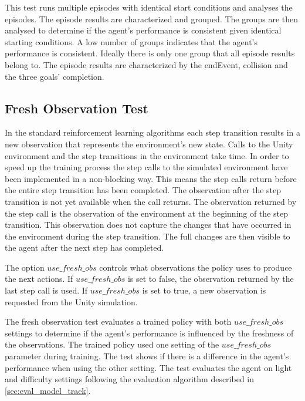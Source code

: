This test runs multiple episodes with identical start conditions and analyses the episodes. The episode results are characterized and grouped. The groups are then analysed to determine if the agent's performance is consistent given identical starting conditions. A low number of groups indicates that the agent's performance is consistent. Ideally there is only one group that all episode results belong to.
The episode results are characterized by the endEvent, collision and the three goals' completion.



\subsection{Fresh Observation Test}

In the standard reinforcement learning algorithms each step transition results in a new observation that represents the environment's new state. Calls to the Unity environment and the step transitions in the environment take time. In order to speed up the training process the step calls to the simulated environment have been implemented in a non-blocking way. This means the step calls return before the entire step transition has been completed. The observation after the step transition is not yet available when the call returns. The observation returned by the step call is the observation of the environment at the beginning of the step transition. This observation does not capture the changes that have occurred in the environment during the step transition. The full changes are then visible to the agent after the next step has completed. 

The option $use\_fresh\_obs$ controls what observations the policy uses to produce the next actions. If $use\_fresh\_obs$ is set to false, the observation returned by the last step call is used. If $use\_fresh\_obs$ is set to true, a new observation is requested from the Unity simulation.

The fresh observation test evaluates a trained policy with both $use\_fresh\_obs$ settings to determine if the agent's performance is influenced by the freshness of the observations. The trained policy used one setting of the $use\_fresh\_obs$ parameter during training. The test shows if there is a difference in the agent's performance when using the other setting. The test evaluates the agent on light and difficulty settings following the evaluation algorithm described in \ref{sec:eval_model_track}.


 
